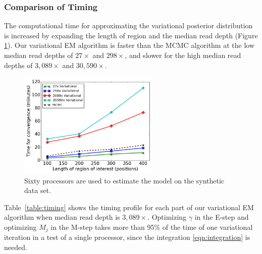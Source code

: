 \documentclass{bmcart}
\begin{document}
\subsubsection{Comparison of Timing}
The computational time for approximating the variational posterior distribution is increased by expanding the length of region and the median read depth (Figure \ref{figure:timing}).
Our variational EM algorithm is faster than the MCMC algorithm at the low median read depths of $27\times$ and $298\times$, and slower for the high median read depths of $3,089\times$ and $30,590\times$.
\begin{figure}[ht]
\centering
\includegraphics[width=0.6\textwidth]{timing.png}
\caption{
Sixty processors are used to estimate the model on the synthetic data set.}\label{figure:timing}
\end{figure}

Table~\ref{table:timing} shows the timing profile for each part of our variational EM algorithm when median read depth is $3,089\times$.
Optimizing $\gamma$ in the E-step and optimizing $M_j$ in the M-step takes more than 95\% of the time of one variational iteration in a test of a single processor, since the integration \eqref{eqn:integration} is needed.
\end{document}
